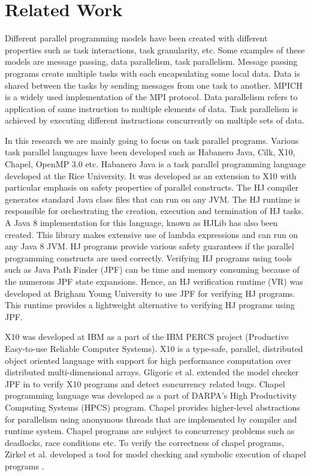 \section{Related Work}

Different parallel programming models have been created with different properties such as task interactions, task granularity,  etc. Some examples of these models are message passing, data parallelism, task parallelism. Message passing \cite{Forum:1994:MMI:898758} programs create multiple tasks with each encapsulating some local data. Data is shared between the tasks by sending messages from one task to another. MPICH is a widely used implementation of the MPI protocol. Data parallelism refers to application of same instruction to multiple elements of data. Task parallelism is achieved by executing different instructions concurrently on multiple sets of data.

In this research we are mainly going to focus on task parallel programs. Various task parallel languages have been developed such as Habanero Java, Cilk, X10, Chapel, OpenMP 3.0 etc. Habanero Java \cite{cave2011habanero} is a task parallel programming language developed at the Rice University. It was developed as an extension to X10 with particular emphasis on safety properties of parallel constructs. The HJ compiler generates standard Java class files that can run on any JVM. The HJ runtime is responsible for orchestrating the creation, execution and termination of HJ tasks. A Java 8 implementation for this language, known as HJLib \cite{imam2014habanero} has also been created. This library makes extensive use of lambda expressions and can run on any Java 8 JVM. HJ programs provide various safety guarantees if the parallel programming constructs are used correctly. Verifying HJ programs using tools such as Java Path Finder (JPF) can be time and memory consuming because of the numerous JPF state expansions. Hence, an HJ verification runtime (VR) \cite{anderson2014jpf} was developed at Brigham Young University to use JPF for verifying HJ programs. This runtime provides a lightweight alternative to verifying HJ programs using JPF.

X10 \cite{charles2005x10} was developed at IBM as a part of the IBM PERCS project (Productive Easy-to-use Reliable Computer Systems). X10 is a type-safe, parallel, distributed object oriented language with support for high performance computation over distributed multi-dimensional arrays. Gligoric et al. extended the model checker JPF in \cite{gligoric2012x10x} to verify X10 programs and detect concurrency related bugs. Chapel programming language \cite{chamberlain2007parallel} was developed as a part of DARPA's High Productivity Computing Systems (HPCS) program. Chapel provides higher-level abstractions for parallelism using anonymous threads that are implemented by compiler and runtime system. Chapel programs are subject to concurrency problems such as deadlocks, race conditions etc. To verify the correctness of chapel programs, Zirkel et al. developed a tool for model checking and symbolic execution of chapel programs \cite{zirkel2013automated}.

